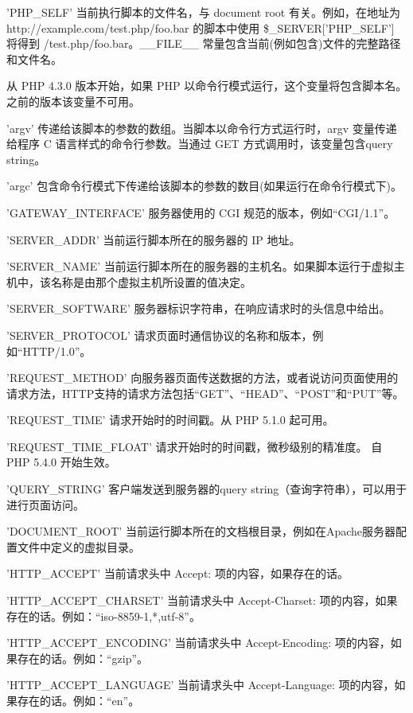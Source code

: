 \begin{compactitem}
\item 'PHP\_SELF'
当前执行脚本的文件名，与 document root 有关。例如，在地址为 http://example.com/test.php/foo.bar 的脚本中使用 \$\_SERVER['PHP\_SELF'] 将得到 /test.php/foo.bar。\_\_FILE\_\_ 常量包含当前(例如包含)文件的完整路径和文件名。 

从 PHP 4.3.0 版本开始，如果 PHP 以命令行模式运行，这个变量将包含脚本名。之前的版本该变量不可用。
\item 'argv'
传递给该脚本的参数的数组。当脚本以命令行方式运行时，argv 变量传递给程序 C 语言样式的命令行参数。当通过 GET 方式调用时，该变量包含query string。
\item 'argc'
包含命令行模式下传递给该脚本的参数的数目(如果运行在命令行模式下)。
\item 'GATEWAY\_INTERFACE'
服务器使用的 CGI 规范的版本，例如“CGI/1.1”。
\item 'SERVER\_ADDR'
当前运行脚本所在的服务器的 IP 地址。
\item 'SERVER\_NAME'
当前运行脚本所在的服务器的主机名。如果脚本运行于虚拟主机中，该名称是由那个虚拟主机所设置的值决定。
\item 'SERVER\_SOFTWARE'
服务器标识字符串，在响应请求时的头信息中给出。
\item 'SERVER\_PROTOCOL'
请求页面时通信协议的名称和版本，例如“HTTP/1.0”。
\item 'REQUEST\_METHOD'
向服务器页面传送数据的方法，或者说访问页面使用的请求方法，HTTP支持的请求方法包括“GET”、“HEAD”、“POST”和“PUT”等。
\item 'REQUEST\_TIME'
请求开始时的时间戳。从 PHP 5.1.0 起可用。
\item 'REQUEST\_TIME\_FLOAT'
请求开始时的时间戳，微秒级别的精准度。 自 PHP 5.4.0 开始生效。
\item 'QUERY\_STRING'
客户端发送到服务器的query string（查询字符串），可以用于进行页面访问。
\item 'DOCUMENT\_ROOT'
当前运行脚本所在的文档根目录，例如在Apache服务器配置文件中定义的虚拟目录。
\item 'HTTP\_ACCEPT'
当前请求头中 Accept: 项的内容，如果存在的话。
\item 'HTTP\_ACCEPT\_CHARSET'
当前请求头中 Accept-Charset: 项的内容，如果存在的话。例如：“iso-8859-1,*,utf-8”。
\item 'HTTP\_ACCEPT\_ENCODING'
当前请求头中 Accept-Encoding: 项的内容，如果存在的话。例如：“gzip”。
\item 'HTTP\_ACCEPT\_LANGUAGE'
当前请求头中 Accept-Language: 项的内容，如果存在的话。例如：“en”。

\end{compactitem}

